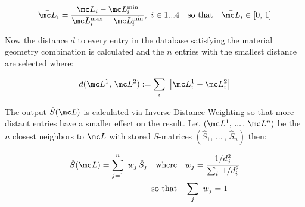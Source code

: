 \begin{equation}
    \bar{\mc L}_i = \frac{\mc L_i - \mc L_i^\s{min}}{\mc L_i^\s{max} - \mc L_i^\s{min}}
    , \  i \in 1 ... 4
    \qq{so that} \bar{\mc L}_i \in [0, \, 1]
\end{equation}

\noindent
Now the distance $d$ to every entry in the database satisfying the material geometry combination is calculated and the $n$ entries with the smallest distance are selected where:

\begin{equation}
    d(\mc L^1, \, \mc L^2) := \sum_i \ \qty|\mc L^1_i - \mc L^2_i|
\end{equation}

\noindent
The output $\hat{S}(\mc L)$ is calculated via Inverse Distance Weighting \cite{Shepard1968} so that more distant entries have a smaller effect on the result. Let
$(\mc L^1, \, ... \, , \, \mc L^n)$ be the $n$ closest neighbors to $\mc L$ with stored $S$-matrices
$(\hat{S}_1, \, ... \, , \, \hat{S}_n)$
then:

\begin{equation}
\begin{aligned}
    \hat{S}(\mc L) = \sum_{j=1}^n \ w_j \, \hat{S}_j
    \qq{where}& w_j = \frac{1 / d_j^2}{\sum_i \ 1 / d^2_i} \\
    \qq*{so that} &\sum_j \ w_j = 1
\end{aligned}
\end{equation}